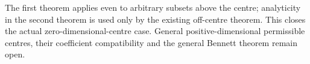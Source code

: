 The first theorem applies even to arbitrary subsets above the centre;
analyticity in the second theorem is used only by the existing
off-centre theorem. This closes the actual zero-dimensional-centre
case. General positive-dimensional permissible centres, their
coefficient compatibility and the general Bennett theorem remain open.
